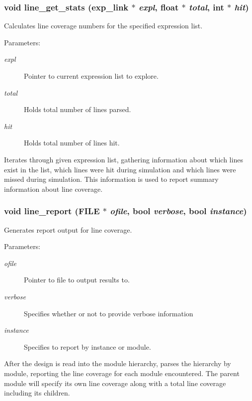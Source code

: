 \subsubsection{\setlength{\rightskip}{0pt plus 5cm}void line\_\-get\_\-stats ({\bf exp\_\-link} $\ast$ {\em expl}, float $\ast$ {\em total}, int $\ast$ {\em hit})}\label{line_8h_a0}


Calculates line coverage numbers for the specified expression list.

\begin{Desc}
\item[Parameters: ]\par
\begin{description}
\item[{\em 
expl}]Pointer to current expression list to explore. \item[{\em 
total}]Holds total number of lines parsed. \item[{\em 
hit}]Holds total number of lines hit.\end{description}
\end{Desc}
Iterates through given expression list, gathering information about which lines exist in the list, which lines were hit during simulation and which lines were missed during simulation. This information is used to report summary information about line coverage. 
\subsubsection{\setlength{\rightskip}{0pt plus 5cm}void line\_\-report (FILE $\ast$ {\em ofile}, {\bf bool} {\em verbose}, {\bf bool} {\em instance})}\label{line_8h_a1}


Generates report output for line coverage.

\begin{Desc}
\item[Parameters: ]\par
\begin{description}
\item[{\em 
ofile}]Pointer to file to output results to. \item[{\em 
verbose}]Specifies whether or not to provide verbose information \item[{\em 
instance}]Specifies to report by instance or module.\end{description}
\end{Desc}
After the design is read into the module hierarchy, parses the hierarchy by module, reporting the line coverage for each module encountered. The parent module will specify its own line coverage along with a total line coverage including its  children. 